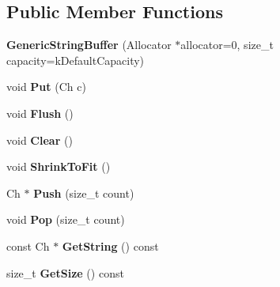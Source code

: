 \subsection*{Public Member Functions}
\begin{DoxyCompactItemize}
\item 
{\bfseries Generic\+String\+Buffer} (Allocator $\ast$allocator=0, size\+\_\+t capacity=k\+Default\+Capacity)\hypertarget{class_generic_string_buffer_a62f5ea1a53a2a3f98088f8c152b6183e}{}\label{class_generic_string_buffer_a62f5ea1a53a2a3f98088f8c152b6183e}

\item 
void {\bfseries Put} (Ch c)\hypertarget{class_generic_string_buffer_a8be5c8fadccacdcf40e20220f38e0afa}{}\label{class_generic_string_buffer_a8be5c8fadccacdcf40e20220f38e0afa}

\item 
void {\bfseries Flush} ()\hypertarget{class_generic_string_buffer_a28bb539487db17b07314a532f3b8847c}{}\label{class_generic_string_buffer_a28bb539487db17b07314a532f3b8847c}

\item 
void {\bfseries Clear} ()\hypertarget{class_generic_string_buffer_a42f15c959046d899cb74c3120a6995f9}{}\label{class_generic_string_buffer_a42f15c959046d899cb74c3120a6995f9}

\item 
void {\bfseries Shrink\+To\+Fit} ()\hypertarget{class_generic_string_buffer_a0dbdb77489b95923795011a24f705be5}{}\label{class_generic_string_buffer_a0dbdb77489b95923795011a24f705be5}

\item 
Ch $\ast$ {\bfseries Push} (size\+\_\+t count)\hypertarget{class_generic_string_buffer_a49fd10cdd5dd97a4cf9813d01334d660}{}\label{class_generic_string_buffer_a49fd10cdd5dd97a4cf9813d01334d660}

\item 
void {\bfseries Pop} (size\+\_\+t count)\hypertarget{class_generic_string_buffer_a0038e53ba03c271bc4cbbac403ec4de4}{}\label{class_generic_string_buffer_a0038e53ba03c271bc4cbbac403ec4de4}

\item 
const Ch $\ast$ {\bfseries Get\+String} () const \hypertarget{class_generic_string_buffer_a42ed917a29012d932802f2709e11c572}{}\label{class_generic_string_buffer_a42ed917a29012d932802f2709e11c572}

\item 
size\+\_\+t {\bfseries Get\+Size} () const \hypertarget{class_generic_string_buffer_abd04725d776322157be3381f5559c40b}{}\label{class_generic_string_buffer_abd04725d776322157be3381f5559c40b}

\end{DoxyCompactItemize}
